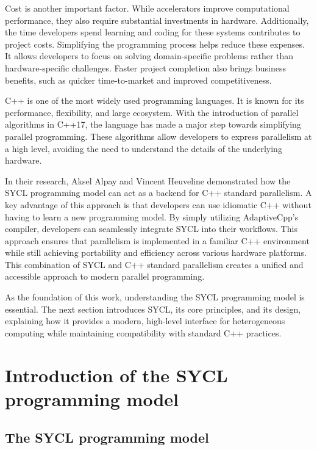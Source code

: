 \documentclass[manuscript,nonacm]{acmart}
\begin{document}
Cost is another important factor.
While accelerators improve computational performance, they also require substantial investments in hardware.
Additionally, the time developers spend learning and coding for these systems contributes to project costs.
Simplifying the programming process helps reduce these expenses.
It allows developers to focus on solving domain-specific problems rather than hardware-specific challenges.
Faster project completion also brings business benefits, such as quicker time-to-market and improved competitiveness.

C++ is one of the most widely used programming languages.
It is known for its performance, flexibility, and large ecosystem.
With the introduction of parallel algorithms in C++17, the language has made a major step towards simplifying
parallel programming.
These algorithms allow developers to express parallelism at a high level, avoiding the need to understand the details of
the underlying hardware.

In their research, Aksel Alpay and Vincent Heuveline demonstrated how the SYCL programming model can act as a
backend for C++ standard parallelism.
A key advantage of this approach is that developers can use idiomatic C++ without having to
learn a new programming model. By simply utilizing AdaptiveCpp’s compiler, developers can seamlessly integrate
SYCL into their workflows. This approach ensures that parallelism is implemented in a familiar C++ environment
while still achieving portability and efficiency across various hardware platforms.
This combination of SYCL and C++ standard parallelism creates a unified and accessible approach to modern
parallel programming.

As the foundation of this work, understanding the SYCL programming model is essential.
The next section introduces SYCL, its core principles, and its design, explaining how it provides a modern,
high-level interface for heterogeneous computing while maintaining compatibility with standard C++ practices.

\section{Introduction of the SYCL programming model}

\subsection{The SYCL programming model}
\end{document}
